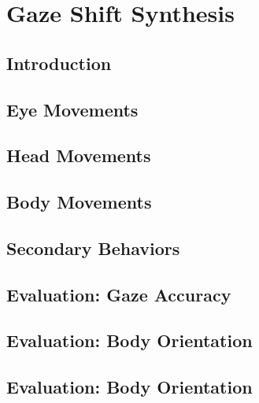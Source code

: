 \pagestyle{deposit}

\chapter{Gaze Shift Synthesis}
\label{cha:GazeShiftModel}

\section{Introduction}
\label{sec:GazeShiftModelIntro}


\section{Eye Movements}
\label{sec:EyeModel}


\section{Head Movements}
\label{sec:HeadModel}


\section{Body Movements}
\label{sec:BodyModel}


\section{Secondary Behaviors}
\label{sec:SecondaryBehaviors}


\section{Evaluation: Gaze Accuracy}
\label{sec:GazeShiftModelEval1}


\section{Evaluation: Body Orientation}
\label{sec:GazeShiftModelEval2}


\section{Evaluation: Body Orientation}
\label{sec:GazeShiftModelDiscussion}

